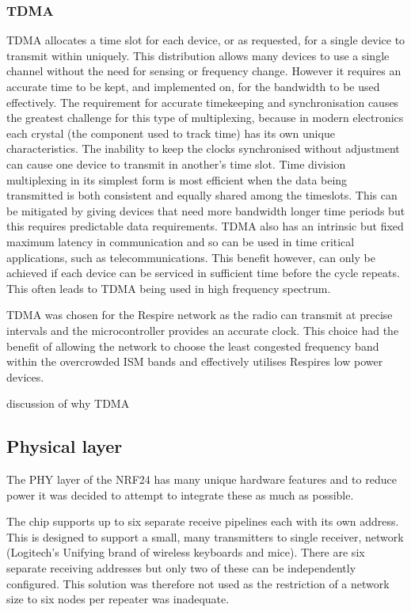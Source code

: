 \subsubsection{\acf{TDMA}}
\ac{TDMA} allocates a time slot for each device, or as requested, for a single device to transmit within
uniquely. This distribution allows many devices to use a single channel without the need for sensing
or frequency change. However it requires an accurate time to be kept, and implemented on, for the
bandwidth to be used effectively. The requirement for accurate timekeeping and synchronisation
causes the greatest challenge for this type of multiplexing, because in modern electronics each
crystal (the component used to track time) has its own unique characteristics. The inability to keep
the clocks synchronised without adjustment can cause one device to transmit in another's time slot.
Time division multiplexing in its simplest form is most efficient when the data being transmitted is
both consistent and equally shared among the timeslots. This can be mitigated by giving devices that
need more bandwidth longer time periods but this requires predictable data requirements.
\ac{TDMA} also has an intrinsic but fixed maximum latency in communication and so can be used in time
critical applications, such as telecommunications. This benefit however, can only be achieved if each
device can be serviced in sufficient time before the cycle repeats. This often leads to \ac{TDMA} being
used in high frequency spectrum.


\ac{TDMA} was chosen for the Respire network as the radio can transmit at precise intervals and the
microcontroller provides an accurate clock. This choice had the benefit of allowing the network to
choose the least congested frequency band within the overcrowded \ac{ISM} bands and effectively
utilises Respires low power devices.


{discussion of why TDMA}


\subsection{Physical layer}
The \acf{PHY} layer of the \ac{NRF24} has many unique hardware features and to reduce power
it was decided to attempt to integrate these as much as possible.


The chip supports up to six separate receive pipelines each with its own address. This is designed to
support a small, many transmitters to single receiver, network (\eg Logitech’s Unifying brand of
wireless keyboards and mice). There are six separate receiving addresses but only two of these can 
be independently configured. This solution was therefore not used as the restriction of a network
size to six nodes per repeater was inadequate.


